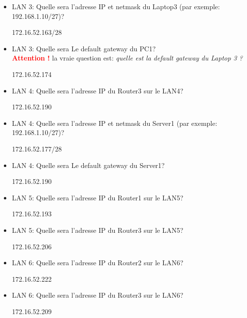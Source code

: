 \documentclass[a4paper]{article}
\begin{document}
\begin{itemize}
    \item LAN 3: Quelle sera l'adresse IP et netmask du Laptop3 (par exemple: 192.168.1.10/27)?
    \begin{example}
        172.16.52.163/28
    \end{example}
    \item LAN 3: Quelle sera Le default gateway du PC1? \\
    \textcolor{red}{\textbf{Attention !}} la vraie question est: \textit{quelle est la default gateway du Laptop 3 ?}
    \begin{example}
        172.16.52.174
    \end{example}
    \item LAN 4: Quelle sera l'adresse IP du Router3 sur le LAN4?
    \begin{example}
        172.16.52.190
    \end{example}
    \item LAN 4: Quelle sera l'adresse IP et netmask du Server1 (par exemple: 192.168.1.10/27)?
    \begin{example}
        172.16.52.177/28
    \end{example}
    \item LAN 4: Quelle sera Le default gateway du Server1?
    \begin{example}
        172.16.52.190
    \end{example}
    \item LAN 5: Quelle sera l'adresse IP du Router1 sur le LAN5?
    \begin{example}
        172.16.52.193
    \end{example}
    \item LAN 5: Quelle sera l'adresse IP du Router3 sur le LAN5?
    \begin{example}
        172.16.52.206
    \end{example}
    \item LAN 6: Quelle sera l'adresse IP du Router2 sur le LAN6?
    \begin{example}
        172.16.52.222
    \end{example}
    \item LAN 6: Quelle sera l'adresse IP du Router3 sur le LAN6?
    \begin{example}
        172.16.52.209
    \end{example}
\end{itemize}
\end{document}
